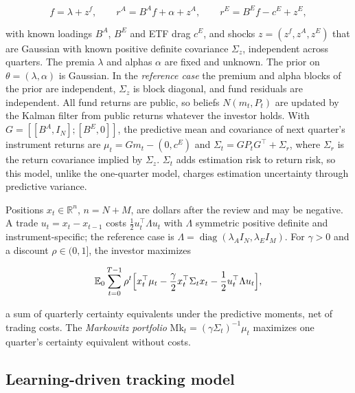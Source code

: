 \documentclass[11pt]{article}
\begin{document}
\begin{equation*}
f=\lambda+z^f,\qquad r^A=B^Af+\alpha+z^A,\qquad r^E=B^Ef-c^E+z^E,
\end{equation*}

with known loadings \(B^A\), \(B^E\) and ETF drag \(c^E\), and shocks
\(z=(z^f,z^A,z^E)\) that are Gaussian with known positive definite
covariance \(\Sigma_z\), independent across quarters. The premia
\(\lambda\) and alphas \(\alpha\) are fixed and unknown. The prior on
\(\theta=(\lambda,\alpha)\) is Gaussian. In the \emph{reference case} the
premium and alpha blocks of the prior are independent, \(\Sigma_z\) is
block diagonal, and fund residuals are independent. All fund returns
are public, so beliefs \(N(m_t,P_t)\) are updated by the Kalman filter
from public returns whatever the investor holds. With
\(G=[[B^A,I_N];[B^E,0]]\), the predictive mean and covariance of next
quarter's instrument returns are
\(\mu_t=Gm_t-(0,c^E)\) and \(\Sigma_t=GP_tG^\top+\Sigma_r\), where \(\Sigma_r\)
is the return covariance implied by \(\Sigma_z\). \(\Sigma_t\) adds
estimation risk to return risk, so this model, unlike the one-quarter
model, charges estimation uncertainty through predictive variance.

Positions \(x_t\in\mathbb R^n\), \(n=N+M\), are dollars after the review
and may be negative. A trade \(u_t=x_t-x_{t-1}\) costs
\(\tfrac12u_t^\top\Lambda u_t\) with \(\Lambda\) symmetric positive definite
and instrument-specific; the reference case is
\(\Lambda=\operatorname{diag}(\lambda_AI_N,\lambda_EI_M)\). For \(\gamma>0\) and a
discount \(\rho\in(0,1]\), the investor maximizes

\begin{equation*}
\mathbb E_0\sum_{t=0}^{T-1}\rho^t\Bigl[x_t^\top\mu_t-\frac\gamma2x_t^\top\Sigma_tx_t
 -\frac12u_t^\top\Lambda u_t\Bigr],
\end{equation*}

a sum of quarterly certainty equivalents under the predictive moments,
net of trading costs. The \emph{Markowitz portfolio}
\(\mathrm{Mk}_t=(\gamma\Sigma_t)^{-1}\mu_t\) maximizes one quarter's
certainty equivalent without costs.

\subsection*{Learning-driven tracking model}
\end{document}
